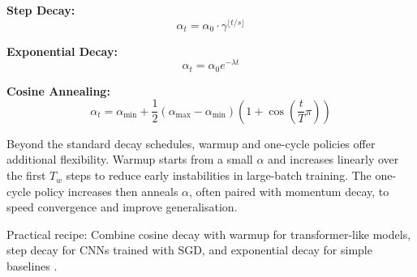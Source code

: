 \textbf{Step Decay:}
\begin{equation}
\alpha_t = \alpha_0 \cdot \gamma^{\lfloor t / s \rfloor}
\end{equation}

\textbf{Exponential Decay:}
\begin{equation}
\alpha_t = \alpha_0 e^{-\lambda t}
\end{equation}

\textbf{Cosine Annealing:}
\begin{equation}
\alpha_t = \alpha_{\min} + \frac{1}{2}(\alpha_{\max} - \alpha_{\min})\left(1 + \cos\left(\frac{t}{T}\pi\right)\right)
\end{equation}

Beyond the standard decay schedules, warmup and one-cycle policies offer additional flexibility. Warmup starts from a small \(\alpha\) and increases linearly over the first \(T_w\) steps to reduce early instabilities in large-batch training. The one-cycle policy increases then anneals \(\alpha\), often paired with momentum decay, to speed convergence and improve generalisation.

Practical recipe: Combine cosine decay with warmup for transformer-like models, step decay for CNNs trained with SGD, and exponential decay for simple baselines \cite{WebOptimizationDLBook,D2LChapterOptimization}.

